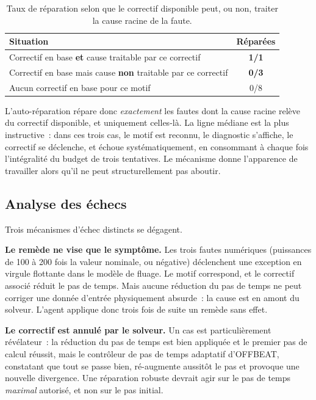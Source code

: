\documentclass[12pt,a4paper,french]{report}
\begin{document}
\begin{table}[htbp]
\centering
\caption[Réparation selon la traitabilité de la cause]{Taux de réparation selon que le correctif disponible peut, ou non,
traiter la cause racine de la faute.}
\label{tab:selfheal-croise}
\begin{tabularx}{0.9\textwidth}{@{}Xc@{}}
\toprule
\textbf{Situation} & \textbf{Réparées}\\
\midrule
Correctif en base \textbf{et} cause traitable par ce correctif & \textbf{1/1}\\
Correctif en base mais cause \textbf{non} traitable par ce correctif &
  \textcolor{cAlert}{\textbf{0/3}}\\
Aucun correctif en base pour ce motif & 0/8\\
\bottomrule
\end{tabularx}
\end{table}

L'auto-réparation répare donc \emph{exactement} les fautes dont la cause racine
relève du correctif disponible, et uniquement celles-là. La ligne médiane est
la plus instructive~: dans ces trois cas, le motif est reconnu, le diagnostic
s'affiche, le correctif se déclenche, et échoue systématiquement, en
consommant à chaque fois l'intégralité du budget de trois tentatives. Le
mécanisme donne l'apparence de travailler alors qu'il ne peut structurellement
pas aboutir.

\subsection{Analyse des échecs}

Trois mécanismes d'échec distincts se dégagent.

\textbf{Le remède ne vise que le symptôme.} Les trois fautes numériques
(puissances de \num{100} à \num{200} fois la valeur nominale, ou négative)
déclenchent une exception en virgule flottante dans le modèle de fluage. Le
motif correspond, et le correctif associé réduit le pas de temps. Mais aucune
réduction du pas de temps ne peut corriger une donnée d'entrée physiquement
absurde~: la cause est en amont du solveur. L'agent applique donc trois fois de
suite un remède sans effet.

\textbf{Le correctif est annulé par le solveur.} Un cas est particulièrement
révélateur~: la réduction du pas de temps est bien appliquée et le premier pas
de calcul réussit, mais le contrôleur de pas de temps adaptatif d'OFFBEAT,
constatant que tout se passe bien, ré-augmente aussitôt le pas et provoque une
nouvelle divergence. Une réparation robuste devrait agir sur le pas de temps
\emph{maximal} autorisé, et non sur le pas initial.
\end{document}

